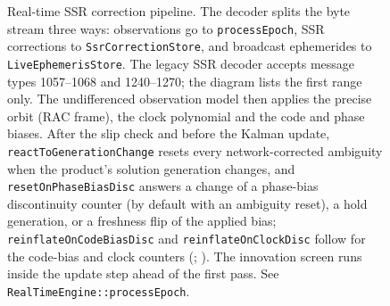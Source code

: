 \documentclass[main.tex]{subfiles}
\begin{document}
\begin{figure}[tbp]
{}
\caption{Real-time SSR correction pipeline. The decoder splits the byte stream
three ways: observations go to \texttt{processEpoch}, SSR corrections to
\texttt{SsrCorrectionStore}, and broadcast ephemerides to
\texttt{LiveEphemerisStore}. The legacy SSR decoder accepts message types
1057--1068 and 1240--1270; the diagram lists the first range only. The
undifferenced observation model then applies the precise orbit (RAC frame), the
clock polynomial and the code and phase biases. After the slip check and
before the Kalman update, \texttt{reactToGenerationChange} resets every
network-corrected ambiguity when the product's solution generation changes, and
\texttt{resetOnPhaseBiasDisc} answers a change of a phase-bias discontinuity
counter (by default with an ambiguity reset), a hold generation, or a
freshness flip of the applied bias; \texttt{reinflateOnCodeBiasDisc} and
\texttt{reinflateOnClockDisc} follow for the code-bias and clock counters
(;
). The
innovation screen runs inside the update step ahead of the first pass. See
\texttt{RealTimeEngine::processEpoch}.}
\label{fig:ssr-pipeline}
\end{figure}
\end{document}
